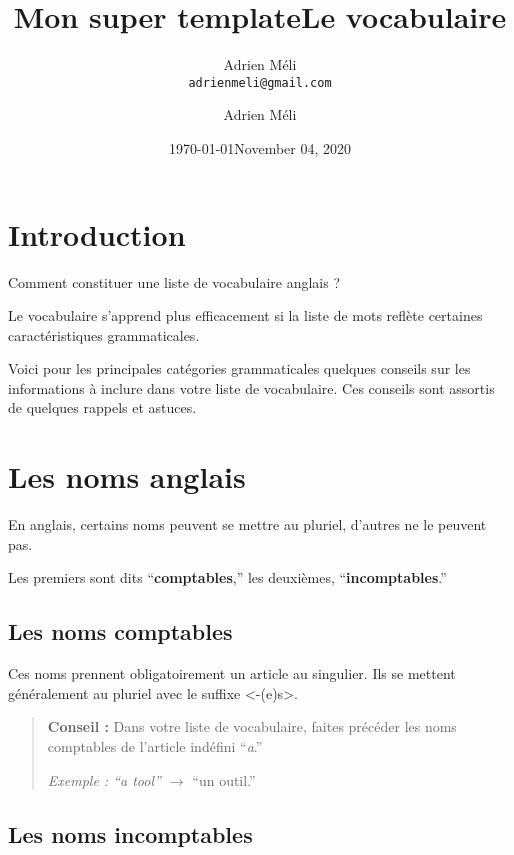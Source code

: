 \documentclass[
  10pt,
]{article}
\title{Mon super template}
\author{Adrien M\'{e}li\\{\tt adrienmeli@gmail.com}}
\date{\today}
\title{Le vocabulaire}
\author{Adrien Méli}
\date{November 04, 2020}
\begin{document}
\maketitle

\pagestyle{fancy}

\hypertarget{introduction}{%
\section{Introduction}\label{introduction}}

Comment constituer une liste de vocabulaire anglais ?

Le vocabulaire s'apprend plus efficacement si la liste de mots reflète certaines caractéristiques grammaticales.

Voici pour les principales catégories grammaticales quelques conseils sur les informations à inclure dans votre liste de vocabulaire.
Ces conseils sont assortis de quelques rappels et astuces.

\hypertarget{les-noms-anglais}{%
\section{Les noms anglais}\label{les-noms-anglais}}

En anglais, certains noms peuvent se mettre au pluriel, d'autres ne le peuvent pas.

Les premiers sont dits ``\textbf{comptables},'' les deuxièmes, ``\textbf{incomptables}.''

\hypertarget{les-noms-comptables}{%
\subsection{Les noms comptables}\label{les-noms-comptables}}

Ces noms prennent obligatoirement un article au singulier.
Ils se mettent généralement au pluriel avec le suffixe \textless-(e)s\textgreater.

\begin{quote}
\textbf{Conseil :} Dans votre liste de vocabulaire, faites précéder les noms comptables de l'article indéfini ``\emph{a}.''

\emph{Exemple : ``a tool'' \(\rightarrow\)} ``un outil.''
\end{quote}

\hypertarget{les-noms-incomptables}{%
\subsection{Les noms incomptables}\label{les-noms-incomptables}}
\end{document}
